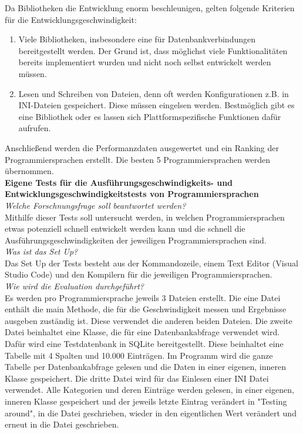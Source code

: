 \documentclass[ngerman]{article}
\begin{document}
    Da Bibliotheken die Entwicklung enorm beschleunigen, gelten folgende Kriterien für die Entwicklungsgeschwindigkeit:
    \begin{enumerate}
        \item Viele Bibliotheken, insbesondere eine für Datenbankverbindungen bereitgestellt werden. Der Grund ist, dass möglichst viele Funktionalitäten bereits implementiert wurden und nicht noch selbst entwickelt werden müssen.
        \item Lesen und Schreiben von Dateien, denn oft werden Konfigurationen z.B. in INI-Dateien gespeichert. Diese müssen eingelsen werden. Bestmöglich gibt es eine Bibliothek oder es lassen sich Plattformspezifische Funktionen dafür aufrufen.
    \end{enumerate}
    Anschließend werden die Performanzdaten ausgewertet und ein Ranking der Programmiersprachen erstellt. Die besten 5 Programmiersprachen werden übernommen.\\
    \textbf{Eigene Tests für die Ausführungsgeschwindigkeits- und Entwicklungsgeschwindigkeitstests von Programmiersprachen}\\
    \textit{Welche Forschnungsfrage soll beantwortet werden?}\\
    Mithilfe dieser Tests soll untersucht werden, in welchen Programmiersprachen etwas potenziell schnell entwickelt werden kann und die schnell die Ausführungsgeschwindigkeiten der jeweiligen Programmiersprachen sind.\\
    \textit{Was ist das Set Up?}\\
    Das Set Up der Tests besteht aus der Kommandozeile, einem Text Editor (Visual Studio Code) und den Kompilern für die jeweiligen Programmiersprachen.\\
    \textit{Wie wird die Evaluation durchgeführt?}\\
    Es werden pro Programmiersprache jeweils 3 Dateien erstellt. Die eine Datei enthält die main Methode, die für die Geschwindigkeit messen und Ergebnisse ausgeben zuständig ist. Diese verwendet die anderen beiden Dateien. Die zweite Datei beinhaltet eine Klasse, die für eine Datenbankabfrage verwendet wird. Dafür wird eine Testdatenbank in SQLite bereitgestellt. Diese beinhaltet eine Tabelle mit 4 Spalten und 10.000 Einträgen. Im Programm wird die ganze Tabelle per Datenbankabfrage gelesen und die Daten in einer eigenen, inneren Klasse gespeichert. Die dritte Datei wird für das Einlesen einer INI Datei verwendet. Alle Kategorien und deren Einträge werden gelesen, in einer eigenen, inneren Klasse gespeichert und der jeweils letzte Eintrag verändert in "Testing around", in die Datei geschrieben, wieder in den eigentlichen Wert verändert und erneut in die Datei geschrieben.\\
\end{document}
